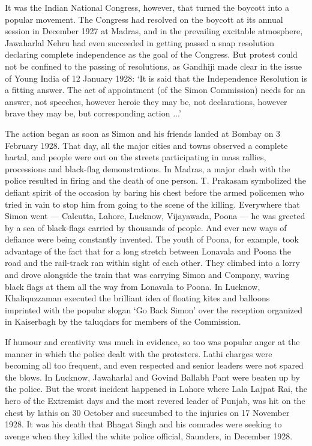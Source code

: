 It was the Indian National Congress, however, that turned the boycott into a popular movement. The Congress had resolved on the boycott at its annual session in December 1927 at Madras, and in the prevailing excitable atmosphere, Jawaharlal Nehru had even succeeded in getting passed a snap resolution declaring complete independence as the goal of the Congress. But protest could not be confined to the passing of resolutions, as Gandhiji made clear in the issue of Young India of 12 January 1928: `It is said that the Independence Resolution is a fitting answer. The act of appointment (of the Simon Commission) needs for an answer, not speeches, however heroic they may be, not declarations, however brave they may be, but corresponding action ...' 

The action began as soon as Simon and his friends landed at Bombay on 3 February 1928. That day, all the major cities and towns observed a complete hartal, and people were out on the streets participating in mass rallies, processions and black-flag demonstrations. In Madras, a major clash with the police resulted in firing and the death of one person. T. Prakasam symbolized the defiant spirit of the occasion by baring his chest before the armed policemen who tried in vain to stop him from going to the scene of the killing. Everywhere that Simon went --- Calcutta, Lahore, Lucknow, Vijayawada, Poona --- he was greeted by a sea of black-flags carried by thousands of people. And ever new ways of defiance were being constantly invented. The youth of Poona, for example, took advantage of the fact that for a long stretch between Lonavala and Poona the road and the rail-track ran within sight of each other. They climbed into a lorry and drove alongside the train that was carrying Simon and Company, waving black flags at them all the way from Lonavala to Poona. In Lucknow, Khaliquzzaman executed the brilliant idea of floating kites and balloons imprinted with the popular slogan `Go Back Simon' over the reception organized in Kaiserbagh by the taluqdars for members of the Commission. 

If humour and creativity was much in evidence, so too was popular anger at the manner in which the police dealt with the protesters. Lathi charges were becoming all too frequent, and even respected and senior leaders were not spared the blows. In Lucknow, Jawaharlal and Govind Ballabh Pant were beaten up by the police. But the worst incident happened in Lahore where Lala Lajpat Rai, the hero of the Extremist days and the most revered leader of Punjab, was hit on the chest by lathis on 30 October and succumbed to the injuries on 17 November 1928. It was his death that Bhagat Singh and his comrades were seeking to avenge when they killed the white police official, Saunders, in December 1928.

